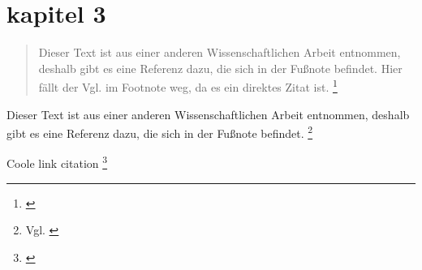 \section{kapitel 3}

\begin{quote}
    Dieser Text ist aus einer anderen Wissenschaftlichen Arbeit entnommen, deshalb 
gibt es eine Referenz dazu, die sich in der Fußnote befindet. Hier fällt der 
Vgl. im Footnote weg, da es ein direktes Zitat ist. \footnote{ \cite[S. 87]{teller1994visibility}}
\end{quote}

Dieser Text ist aus einer anderen Wissenschaftlichen Arbeit entnommen, deshalb 
gibt es eine Referenz dazu, die sich in der Fußnote befindet. \footnote{Vgl. \cite[S. 57]{teller1994visibility}}


Coole link citation  \footnote{ \cite{Asynchrony}}